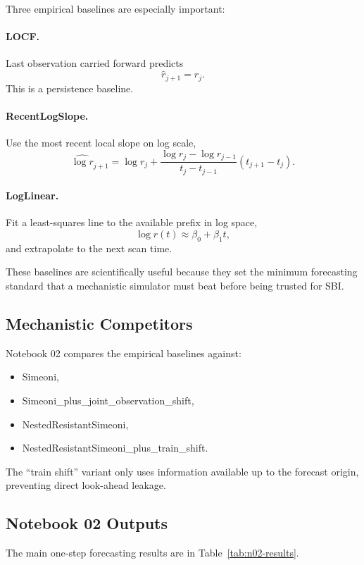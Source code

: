 \documentclass[11pt,a4paper]{article}
\begin{document}
Three empirical baselines are especially important:

\paragraph{LOCF.}
Last observation carried forward predicts
\[
    \widehat r_{j+1}=r_j.
\]
This is a persistence baseline.

\paragraph{RecentLogSlope.}
Use the most recent local slope on log scale,
\[
    \widehat{\log r}_{j+1}
    =
    \log r_j
    +
    \frac{\log r_j-\log r_{j-1}}{t_j-t_{j-1}}
    (t_{j+1}-t_j).
\]

\paragraph{LogLinear.}
Fit a least-squares line to the available prefix in log space,
\[
    \log r(t)\approx \beta_0+\beta_1 t,
\]
and extrapolate to the next scan time.

These baselines are scientifically useful because they set the minimum forecasting standard that a mechanistic simulator must beat before being trusted for SBI.

\subsection{Mechanistic Competitors}

Notebook 02 compares the empirical baselines against:
\begin{itemize}[leftmargin=2em]
    \item Simeoni,
    \item Simeoni\_plus\_joint\_observation\_shift,
    \item NestedResistantSimeoni,
    \item NestedResistantSimeoni\_plus\_train\_shift.
\end{itemize}

The ``train shift'' variant only uses information available up to the forecast origin, preventing direct look-ahead leakage.

\subsection{Notebook 02 Outputs}

The main one-step forecasting results are in Table~\ref{tab:n02-results}.
\end{document}
